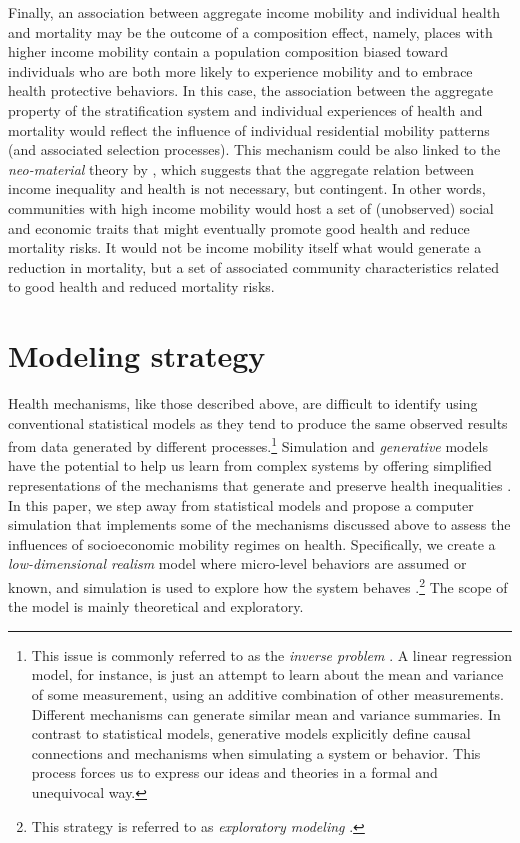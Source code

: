 \documentclass[class=article, crop=false, 12pt]{standalone}
\begin{document}
Finally, an association between aggregate income mobility and individual health and mortality may be the outcome of a composition effect, namely, places with higher income mobility contain a population composition biased toward individuals who are both more likely to experience mobility and to embrace health protective behaviors. In this case, the association between the aggregate property of the stratification system and individual experiences of health and mortality would reflect the influence of individual residential mobility patterns (and associated selection processes). This mechanism could be also linked to the \textit{neo-material} theory by \citet{lynch2004a}, which suggests that the aggregate relation between income inequality and health is not necessary, but contingent. In other words, communities with high income mobility would host a set of (unobserved) social and economic traits that might eventually promote good health and reduce mortality risks. It would not be income mobility itself what would generate a reduction in mortality, but a set of associated community characteristics related to good health and reduced mortality risks.

\section{Modeling strategy}

Health mechanisms, like those described above, are difficult to identify using conventional statistical models as they tend to produce the same observed results from data generated by different processes.\footnote{This issue is commonly referred to as the \textit{inverse problem} \citep{mcelreath2020}. A linear regression model, for instance, is just an attempt to learn about the mean and variance of some measurement, using an additive combination of other measurements. Different mechanisms can generate similar mean and variance summaries. In contrast to statistical models, generative models explicitly define causal connections and mechanisms when simulating a system or behavior. This process forces us to express our ideas and theories in a formal and unequivocal way.} Simulation and \textit{generative} models have the potential to help us learn from complex systems by offering simplified representations of the mechanisms that generate and preserve health inequalities \citep{wolfson2017, speybroeck2013, railsback2011, smaldino2017}. In this paper, we step away from statistical models and propose a computer simulation that implements some of the mechanisms discussed above to assess the influences of socioeconomic mobility regimes on health. Specifically, we create a \emph{low-dimensional realism} model where micro-level behaviors are assumed or known, and simulation is used to explore how the system behaves \citep{edmonds2019}.\footnote{This strategy is referred to as \emph{exploratory modeling} \citep{wilensky2015}.} The scope of the model is mainly theoretical and exploratory.
\end{document}
